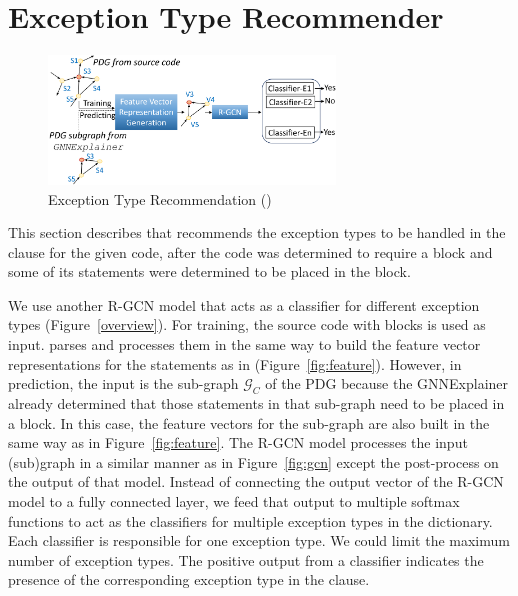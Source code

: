\section{Exception Type Recommender}
\label{sec:type}

\begin{figure}[t]
\begin{center}
\includegraphics[width=3in]{xtype-2.png}
\vspace{-10pt}
\caption{Exception Type Recommendation ({\xtype})}
\label{fig:xtype}
\end{center}
\end{figure}

This section describes {\xtype} that recommends the exception types to
be handled in the  clause for the given code, after the code was
determined to require a  block and some of its
statements were determined to be placed in the  block.

We use another R-GCN model that acts as a classifier for different
exception types (Figure~\ref{overview}). For training, the source code
with  blocks is used as input. {\tool} parses and
processes them in the same way to build the feature vector
representations for the statements as in {\xblock}
(Figure~\ref{fig:feature}). However, in prediction, the input is the
sub-graph $\mathcal{G}_C$ of the PDG because the GNNExplainer already
determined that those statements in that sub-graph need to be placed
in a  block. In this case, the feature vectors for the
sub-graph are also built in the same way as in
Figure~\ref{fig:feature}. The R-GCN model processes the input
(sub)graph in a similar manner as in Figure~\ref{fig:gcn} except the
post-process on the output of that model.  Instead of connecting the
output vector of the R-GCN model to a fully connected layer, we feed
that output to multiple softmax functions to act as the classifiers
for multiple exception types in the dictionary. Each classifier is
responsible for one exception type.  We could limit the maximum number
of exception types. The positive output from a classifier indicates
the presence of the corresponding exception type in the 
clause.
